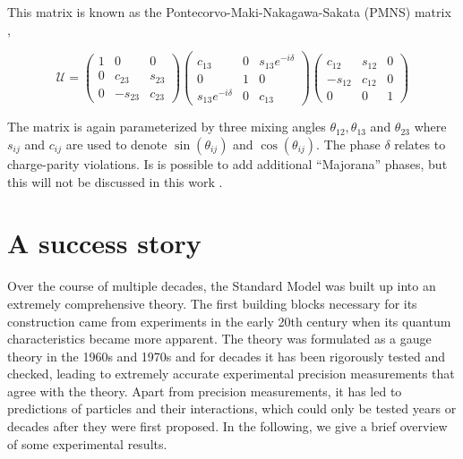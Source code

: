 \noindent This matrix is known as the Pontecorvo-Maki-Nakagawa-Sakata (PMNS) matrix \cite{doi:10.1143/PTP.28.870},

\begin{equation}
\mathcal{U} = \begin{pmatrix}
1 	& 0 		& 0 \\
0 	& c_{23}	& s_{23} \\
0	& -s_{23} 	& c_{23}
\end{pmatrix}
\begin{pmatrix}
c_{13} 				& 0 		& s_{13}e^{-i\delta} \\
0 					& 1			& 0 \\
s_{13}e^{-i\delta}	& 0 		& c_{13}
\end{pmatrix}
\begin{pmatrix}
c_{12} 	& s_{12}	& 0 \\
-s_{12} & c_{12}	& 0 \\
0		& 0			& 1
\end{pmatrix}
\end{equation}

\noindent The matrix is again parameterized by three mixing angles $\theta_{12}, \theta_{13}$ and $\theta_{23}$ where $s_{ij}$ and $c_{ij}$ are used to denote $\sin\left(\theta_{ij}\right)$ and $\cos\left(\theta_{ij}\right)$. The phase $\delta$ relates to charge-parity violations. Is is possible to add additional ``Majorana'' phases, but this will not be discussed in this work \cite{Giganti:2017fhf}.
 
\section{A success story}
Over the course of multiple decades, the Standard Model was built up into an extremely comprehensive theory. The first building blocks necessary for its construction came from experiments in the early 20th century when its quantum characteristics became more apparent. The theory was formulated as a gauge theory in the 1960s and 1970s and for decades it has been rigorously tested and checked, leading to extremely accurate experimental precision measurements that agree with the theory. Apart from precision measurements, it has led to predictions of particles and their interactions, which could only be tested years or decades after they were first proposed. In the following, we give a brief overview of some experimental results.

\iffalse
